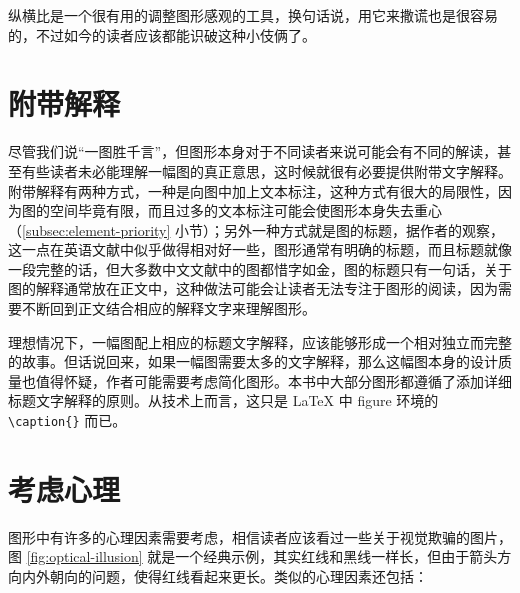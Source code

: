 \documentclass[
  b5paper,
  UTF8,twoside]{book}
\begin{document}
纵横比是一个很有用的调整图形感观的工具，换句话说，用它来撒谎也是很容易的，不过如今的读者应该都能识破这种小伎俩了。

\hypertarget{ux9644ux5e26ux89e3ux91ca}{%
\section{附带解释}\label{ux9644ux5e26ux89e3ux91ca}}

尽管我们说``一图胜千言''，但图形本身对于不同读者来说可能会有不同的解读，甚至有些读者未必能理解一幅图的真正意思，这时候就很有必要提供附带文字解释。附带解释有两种方式，一种是向图中加上文本标注，这种方式有很大的局限性，因为图的空间毕竟有限，而且过多的文本标注可能会使图形本身失去重心（\ref{subsec:element-priority} 小节）；另外一种方式就是图的标题，据作者的观察，这一点在英语文献中似乎做得相对好一些，图形通常有明确的标题，而且标题就像一段完整的话，但大多数中文文献中的图都惜字如金，图的标题只有一句话，关于图的解释通常放在正文中，这种做法可能会让读者无法专注于图形的阅读，因为需要不断回到正文结合相应的解释文字来理解图形。

理想情况下，一幅图配上相应的标题文字解释，应该能够形成一个相对独立而完整的故事。但话说回来，如果一幅图需要太多的文字解释，那么这幅图本身的设计质量也值得怀疑，作者可能需要考虑简化图形。本书中大部分图形都遵循了添加详细标题文字解释的原则。从技术上而言，这只是 LaTeX 中 figure 环境的 \texttt{\textbackslash{}caption\{\}} 而已。

\hypertarget{sec:psychology}{%
\section{考虑心理}\label{sec:psychology}}

图形中有许多的心理因素需要考虑，相信读者应该看过一些关于视觉欺骗的图片，图 \ref{fig:optical-illusion} 就是一个经典示例，其实红线和黑线一样长，但由于箭头方向内外朝向的问题，使得红线看起来更长。类似的心理因素还包括：
\end{document}
